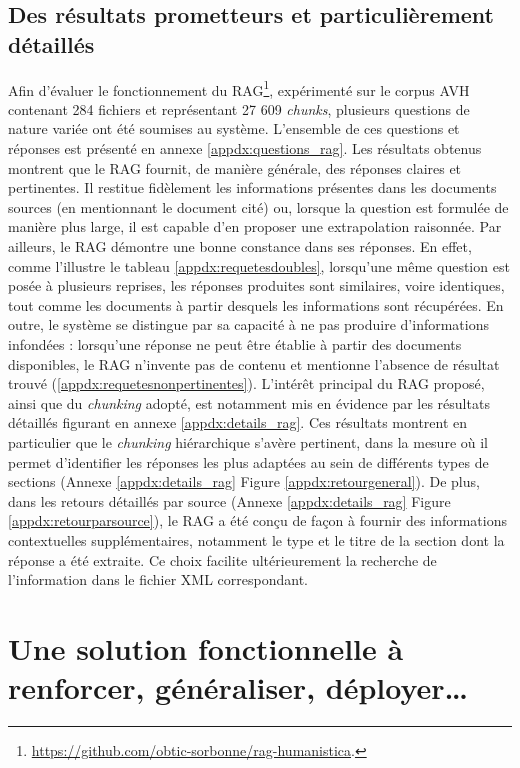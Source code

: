 \documentclass[final, fra]{anthology-ch}     %
\begin{document}
\subsection{Des résultats prometteurs et particulièrement détaillés}
Afin d’évaluer le fonctionnement du RAG\footnote{\url{https://github.com/obtic-sorbonne/rag-humanistica}.}, expérimenté sur le corpus AVH contenant 284 fichiers et représentant 27 609 \textit{chunks}, plusieurs questions de nature variée ont été soumises au système. L’ensemble de ces questions et réponses est présenté en annexe \ref{appdx:questions_rag}. Les résultats obtenus montrent que le RAG fournit, de manière générale, des réponses claires et pertinentes. Il restitue fidèlement les informations présentes dans les documents sources (en mentionnant le document cité) ou, lorsque la question est formulée de manière plus large, il est capable d’en proposer une extrapolation raisonnée.
Par ailleurs, le RAG démontre une bonne constance dans ses réponses. En effet, comme l’illustre le tableau \ref{appdx:requetesdoubles}, lorsqu’une même question est posée à plusieurs reprises, les réponses produites sont similaires, voire identiques, tout comme les documents à partir desquels les informations sont récupérées. En outre, le système se distingue par sa capacité à ne pas produire d’informations infondées : lorsqu’une réponse ne peut être établie à partir des documents disponibles, le RAG n’invente pas de contenu et mentionne l’absence de résultat trouvé (\ref{appdx:requetesnonpertinentes}).
L’intérêt principal du RAG proposé, ainsi que du \textit{chunking} adopté, est notamment mis en évidence par les résultats détaillés figurant en annexe \ref{appdx:details_rag}. Ces résultats montrent en particulier que le \textit{chunking} hiérarchique s’avère pertinent, dans la mesure où il permet d’identifier les réponses les plus adaptées au sein de différents types de sections (Annexe \ref{appdx:details_rag} Figure \ref{appdx:retourgeneral}).
De plus, dans les retours détaillés par source (Annexe \ref{appdx:details_rag} Figure \ref{appdx:retourparsource}), le RAG a été conçu de façon à fournir des informations contextuelles supplémentaires, notamment le type et le titre de la section dont la réponse a été extraite. Ce choix facilite ultérieurement la recherche de l’information dans le fichier XML correspondant. 

\section{Une solution fonctionnelle à renforcer, généraliser, déployer…}
\end{document}
